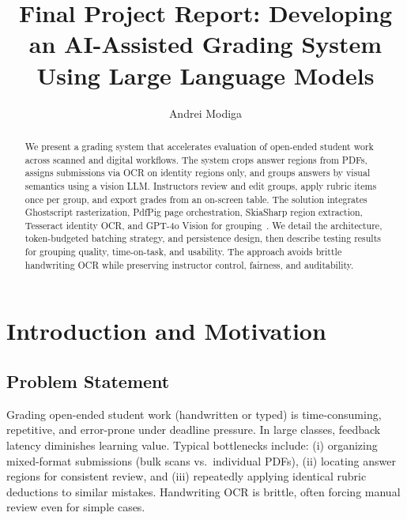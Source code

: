 \documentclass[ms,twoside,print]{nuthesis}
\begin{document}
\frontmatter

\title{Final Project Report: Developing an AI-Assisted Grading System Using Large Language Models}
\author{Andrei Modiga}

\maketitle

\begin{abstract}
We present a grading system that accelerates evaluation of open-ended student work across scanned and digital workflows. The system crops answer regions from PDFs, assigns submissions via OCR on identity regions only, and groups answers by visual semantics using a vision LLM. Instructors review and edit groups, apply rubric items once per group, and export grades from an on-screen table. The solution integrates Ghostscript rasterization, PdfPig page orchestration, SkiaSharp region extraction, Tesseract identity OCR, and GPT-4o Vision for grouping~\cite{ghostscript,pdfpig,skiasharp,tesseract,openai-gpt4o}. We detail the architecture, token-budgeted batching strategy, and persistence design, then describe testing results for grouping quality, time-on-task, and usability. The approach avoids brittle handwriting OCR while preserving instructor control, fairness, and auditability.
\end{abstract}

\setcounter{tocdepth}{2}
\tableofcontents
\listoffigures
\listoftables

\mainmatter

\chapter{Introduction and Motivation}
\section{Problem Statement}
Grading open-ended student work (handwritten or typed) is time-consuming, repetitive, and error-prone under deadline pressure. In large classes, feedback latency diminishes learning value. Typical bottlenecks include: (i) organizing mixed-format submissions (bulk scans vs.\ individual PDFs), (ii) locating answer regions for consistent review, and (iii) repeatedly applying identical rubric deductions to similar mistakes. Handwriting OCR is brittle, often forcing manual review even for simple cases.
\end{document}
